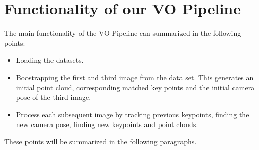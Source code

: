 \chapter{Functionality of our VO Pipeline}
The main functionality of the VO Pipeline can summarized in the following points:

\begin{itemize}
  \item Loading the datasets.
  \item Boostrapping the first and third image from the data set. This generates an initial point cloud, corresponding matched key points and the initial camera pose of the third image. 
  \item Process each subsequent image by tracking previous keypoints, finding the new camera pose, finding new keypoints and point clouds.
\end{itemize}

These points will be summarized in the following paragraphs.

